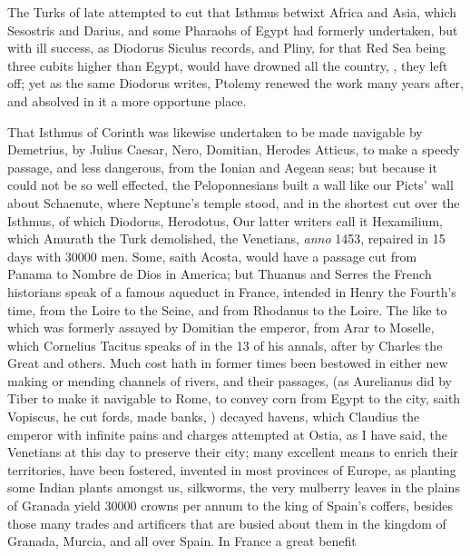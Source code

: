 The Turks of late attempted to cut that Isthmus betwixt Africa and Asia, which
Sesostris and Darius, and some Pharaohs of Egypt had
formerly undertaken, but with ill success, as Diodorus
Siculus records, and Pliny, for that Red Sea being three
cubits higher than Egypt, would have drowned all the
country, , they left off; yet as the same
Diodorus writes, Ptolemy renewed the work many years after,
and absolved in it a more opportune place.

That Isthmus of Corinth was likewise undertaken to be made navigable by
Demetrius, by Julius Caesar, Nero, Domitian, Herodes Atticus, to make a speedy
passage, and less dangerous, from the Ionian and Aegean
seas; but because it could not be so well effected, the Peloponnesians built a
wall like our Picts' wall about Schaenute, where Neptune's temple stood, and in
the shortest cut over the Isthmus, of which Diodorus,  Herodotus,  Our latter writers call
it Hexamilium, which Amurath the Turk demolished, the Venetians, \emph{anno}
1453, repaired in 15 days with 30\thinspace{}000 men. Some, saith Acosta, would
have a passage cut from Panama to Nombre de Dios in America; but Thuanus and
Serres the French historians speak of a famous aqueduct in France, intended in
Henry the Fourth's time, from the Loire to the Seine, and from Rhodanus to the
Loire. The like to which was formerly assayed by Domitian the emperor,
from Arar to Moselle, which Cornelius Tacitus speaks of in
the 13 of his annals, after by Charles the Great and others. Much cost hath in
former times been bestowed in either new making or mending channels of rivers,
and their passages, (as Aurelianus did by Tiber to make it navigable to Rome,
to convey corn from Egypt to the city,  saith
Vopiscus,  he cut fords, made banks, \etc{})
decayed havens, which Claudius the emperor with infinite pains and charges
attempted at Ostia, as I have said, the Venetians at this day to preserve their
city; many excellent means to enrich their territories, have been fostered,
invented in most provinces of Europe, as planting some Indian plants amongst
us, silkworms, the very mulberry leaves in the plains of
Granada yield 30\thinspace{}000 crowns per annum to the king of Spain's
coffers, besides those many trades and artificers that are busied about them in
the kingdom of Granada, Murcia, and all over Spain. In France a great benefit
